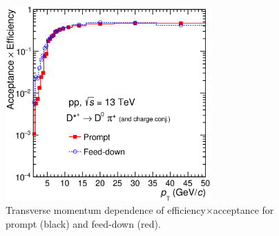 \begin{figure}[tb]
\begin{center}
 \includegraphics[width=0.7\textwidth]{figures/Dstar/pp13TeV/DstarAccEffVsPt_pp_13TeV.eps}
\caption{Transverse momentum dependence of efficiency$\times$acceptance for prompt (black) and feed-down (red).}
\label{fig:Dstar_eff}
\end{center}
\end{figure}

